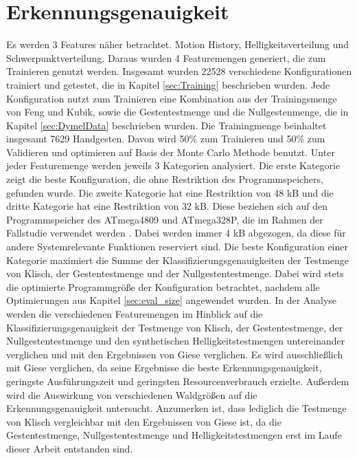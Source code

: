 \section{Erkennungsgenauigkeit}
Es werden 3 Features näher betrachtet. Motion History, Helligkeitsverteilung und Schwerpunktverteilung. Daraus wurden 4 Featuremengen generiert, die zum Trainieren genutzt werden. Insgesamt wurden 22528
verschiedene Konfigurationen trainiert und getestet, die in Kapitel \ref{sec:Training} beschrieben wurden. Jede Konfiguration nutzt zum Trainieren eine Kombination aus der Trainingsmenge von Feng und Kubik,
sowie die Gestentestmenge und die Nullgestenmenge, die in Kapitel \ref{sec:DymelData} beschrieben wurden. Die Trainingmenge beinhaltet insgesamt 7629 Handgesten. Davon wird 50\% zum Trainieren und 50\% zum
Validieren und optimieren auf Basis der Monte Carlo Methode benutzt.
\newline
\newline
Unter jeder Featuremenge werden jeweils 3 Kategorien analysiert. Die erste Kategorie zeigt die beste Konfiguration, die ohne Restriktion des Programmspeichers, gefunden wurde. Die zweite Kategorie hat eine Restriktion
von 48 kB und die dritte Kategorie hat eine Restriktion von 32 kB. Diese beziehen sich auf den Programmspeicher des ATmega4809 und ATmega328P, die im Rahmen der Fallstudie verwendet werden \cite{venzkeArticle}.
Dabei werden immer 4 kB abgezogen, da diese für andere Systemrelevante Funktionen reserviert sind. Die beste Konfiguration einer Kategorie maximiert die Summe
der Klassifizierungsgenauigkeiten der Testmenge von Klisch, der Gestentestmenge und der Nullgestentestmenge. Dabei wird stets die optimierte Programmgröße der Konfiguration betrachtet, nachdem alle Optimierungen aus Kapitel
\ref{sec:eval_size} angewendet wurden.
\newline
\newline
In der Analyse werden die verschiedenen Featuremengen im Hinblick auf die Klassifizierungsgenauigkeit der Testmenge von Klisch, der Gestentestmenge, der Nullgestentestmenge und den synthetischen
Helligkeitstestmengen untereinander verglichen und mit den Ergebnissen von Giese verglichen. Es wird ausschließlich mit Giese verglichen, da seine Ergebnisse die beste Erkennungsgenauigkeit, geringste Ausführungszeit und
geringsten Resourcenverbrauch erzielte. Außerdem wird die Auswirkung von verschiedenen Waldgrößen auf die Erkennungsgenauigkeit untersucht. Anzumerken ist, dass lediglich die Testmenge von Klisch vergleichbar mit
den Ergebnissen von Giese ist, da die Gestentestmenge, Nullgestentestmenge und Helligkeitstestmengen erst im Laufe dieser Arbeit entstanden sind.








